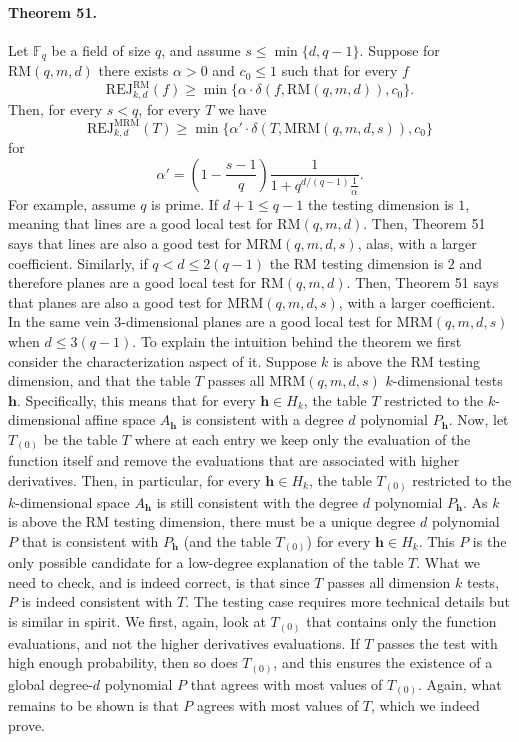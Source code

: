 \paragraph{Theorem 51.} Let $\mathbb F_q$ be a field of size $q$, and assume $s\leq\min\{d,q-1\}$. Suppose for $\mathrm{RM}(q,m,d)$ there exists $\alpha>0$ and $c_0\leq1$ such that for every $f$
\[\mathrm{REJ}_{k,d}^{\mathrm{RM}}(f)\geq\min\{\alpha\cdot\delta(f,\mathrm{RM}(q,m,d)),c_0\}.\]
Then, for every $s<q$, for every $T$ we have
\[\mathrm{REJ}_{k,d}^{\mathrm{MRM}}(T)\geq\min\{\alpha'\cdot\delta(T,\mathrm{MRM}(q,m,d,s)),c_0\}\tag{6}\]
for
\[\alpha'=\left(1-\frac{s-1}{q}\right)\frac1{1+q^{d/(q-1)}\frac1\alpha}.\tag{7}\]
For example, assume $q$ is prime. If $d+1\leq q-1$ the testing dimension is $1$, meaning that lines are a good local test for $\mathrm{RM}(q,m,d)$. Then, Theorem 51 says that lines are also a good test for $\mathrm{MRM}(q,m,d,s)$, alas, with a larger coefficient. Similarly, if $q<d\leq2(q-1)$ the RM testing dimension is $2$ and therefore planes are a good local test for $\mathrm{RM}(q,m,d)$. Then, Theorem 51 says that planes are also a good test for $\mathrm{MRM}(q,m,d,s)$, with a larger coefficient. In the same vein 3-dimensional planes are a good local test for $\mathrm{MRM}(q,m,d,s)$ when $d\leq3(q-1)$.
To explain the intuition behind the theorem we first consider the characterization aspect of it. Suppose $k$ is above the RM testing dimension, and that the table $T$ passes all $\mathrm{MRM}(q,m,d,s)$ $k$-dimensional tests $\boldsymbol h$. Specifically, this means that for every $\boldsymbol h\in H_k$, the table $T$ restricted to the $k$-dimensional affine space $A_{\boldsymbol h}$ is consistent with a degree $d$ polynomial $P_{\boldsymbol h}$. Now, let $T_{(0)}$ be the table $T$ where at each entry we keep only the evaluation of the function itself and remove the evaluations that are associated with higher derivatives. Then, in particular, for every $\boldsymbol h\in H_k$, the table $T_{(0)}$ restricted to the $k$-dimensional space $A_{\boldsymbol h}$ is still consistent with the degree $d$ polynomial $P_{\boldsymbol h}$. As $k$ is above the RM testing dimension, there must be a unique degree $d$ polynomial $P$ that is consistent with $P_{\boldsymbol h}$ (and the table $T_{(0)}$) for every $\boldsymbol h\in H_k$. This $P$ is the only possible candidate for a low-degree explanation of the table $T$. What we need to check, and is indeed correct, is that since $T$ passes all dimension $k$ tests, $P$ is indeed consistent with $T$.
The testing case requires more technical details but is similar in spirit. We first, again, look at $T_{(0)}$ that contains only the function evaluations, and not the higher derivatives evaluations. If $T$ passes the test with high enough probability, then so does $T_{(0)}$, and this ensures the existence of a global degree-$d$ polynomial $P$ that agrees with most values of $T_{(0)}$. Again, what remains to be shown is that $P$ agrees with most values of $T$, which we indeed prove.
